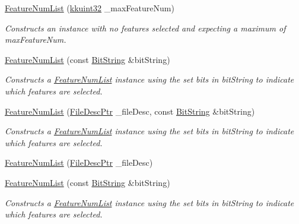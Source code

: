 \begin{DoxyCompactItemize}
\hyperlink{class_k_k_m_l_l_1_1_feature_num_list_a54ab41b28c013cd9374875510e9ef83e}{Feature\+Num\+List} (\hyperlink{namespace_k_k_b_af8d832f05c54994a1cce25bd5743e19a}{kkuint32} \+\_\+max\+Feature\+Num)
\begin{DoxyCompactList}\small\item\em Constructs an instance with no features selected and expecting a maximum of \textquotesingle{}max\+Feature\+Num\textquotesingle{}. \end{DoxyCompactList}\item 
\hyperlink{class_k_k_m_l_l_1_1_feature_num_list_a6a3b536a2432deb265adb2b6b09a5744}{Feature\+Num\+List} (const \hyperlink{class_k_k_b_1_1_bit_string}{Bit\+String} \&bit\+String)
\begin{DoxyCompactList}\small\item\em Constructs a \textquotesingle{}\hyperlink{class_k_k_m_l_l_1_1_feature_num_list}{Feature\+Num\+List}\textquotesingle{} instance using the set bits in \textquotesingle{}bit\+String\textquotesingle{} to indicate which features are selected. \end{DoxyCompactList}\item 
\hyperlink{class_k_k_m_l_l_1_1_feature_num_list_a997b022244ed4ec345cd2b3dde83581c}{Feature\+Num\+List} (\hyperlink{namespace_k_k_m_l_l_aa0d0b6ab4ec18868a399b8455b05d914}{File\+Desc\+Ptr} \+\_\+file\+Desc, const \hyperlink{class_k_k_b_1_1_bit_string}{Bit\+String} \&bit\+String)
\begin{DoxyCompactList}\small\item\em Constructs a \textquotesingle{}\hyperlink{class_k_k_m_l_l_1_1_feature_num_list}{Feature\+Num\+List}\textquotesingle{} instance using the set bits in \textquotesingle{}bit\+String\textquotesingle{} to indicate which features are selected. \end{DoxyCompactList}\item 
\hyperlink{class_k_k_m_l_l_1_1_feature_num_list_a741afa04a7a2bf4a271cb98d1fb4681a}{Feature\+Num\+List} (\hyperlink{namespace_k_k_m_l_l_aa0d0b6ab4ec18868a399b8455b05d914}{File\+Desc\+Ptr} \+\_\+file\+Desc)
\item 
\hyperlink{class_k_k_m_l_l_1_1_feature_num_list_a20f4c983a501e7e045c06d8427458f59}{Feature\+Num\+List} (const \hyperlink{class_k_k_b_1_1_bit_string}{Bit\+String} \&bit\+String)
\begin{DoxyCompactList}\small\item\em Constructs a \textquotesingle{}\hyperlink{class_k_k_m_l_l_1_1_feature_num_list}{Feature\+Num\+List}\textquotesingle{} instance using the set bits in \textquotesingle{}bit\+String\textquotesingle{} to indicate which features are selected. \end{DoxyCompactList}\item 

\end{DoxyCompactItemize}
